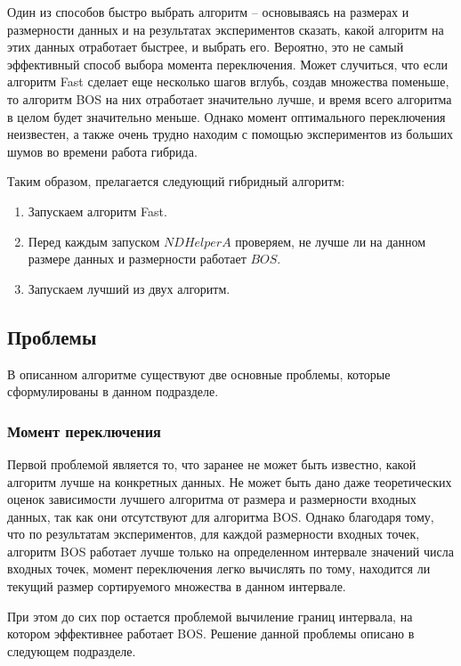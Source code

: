 Один из способов быстро выбрать алгоритм -- основываясь на размерах и размерности данных и на результатах экспериментов сказать, какой алгоритм на этих данных отработает быстрее, и выбрать его. Вероятно, это не самый эффективный способ выбора момента переключения. Может случиться, что если алгоритм Fast сделает еще несколько шагов вглубь, создав множества поменьше, то алгоритм BOS на них отработает значительно лучше, и время всего алгоритма в целом будет значительно меньше. Однако момент оптимального переключения неизвестен, а также очень трудно находим с помощью экспериментов из больших шумов во времени работа гибрида.

Таким образом, прелагается следующий гибридный алгоритм:
\begin{enumerate}
 \item Запускаем алгоритм Fast.
 \item Перед каждым запуском $NDHelperA$ проверяем, не лучше ли на данном размере данных и размерности работает $BOS$.
 \item Запускаем лучший из двух алгоритм.
\end{enumerate}

\subsection{Проблемы}

В описанном алгоритме существуют две основные проблемы, которые сформулированы в данном подразделе.

\subsubsection{Момент переключения}

Первой проблемой является то, что заранее не может быть известно, какой алгоритм лучше на конкретных данных. Не может быть дано даже теоретических оценок зависимости лучшего алгоритма от размера и размерности входных данных, так как они отсутствуют для алгоритма BOS. Однако благодаря тому, что по результатам экспериментов, для каждой размерности входных точек, алгоритм BOS работает лучше только на определенном интервале значений числа входных точек, момент переключения легко вычислять по тому, находится ли текущий размер сортируемого множества в данном интервале.

При этом до сих пор остается проблемой вычиление границ интервала, на котором эффективнее работает BOS. Решение данной проблемы описано в следующем подразделе.

